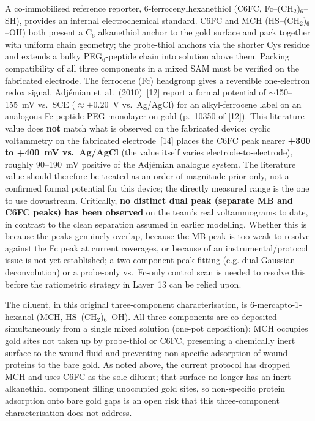 \documentclass[10pt,a4paper]{article}
\numberwithin{equation}{section}
\newcommand{\cit}[1]{[#1]}   %
\begin{document}
A co-immobilised reference reporter, 6-ferrocenylhexanethiol (C6FC,
Fc--(CH$_2$)$_6$--SH), provides an internal electrochemical standard. C6FC and MCH
(HS--(CH$_2$)$_6$--OH) both present a C$_6$ alkanethiol anchor to the gold surface
and pack together with uniform chain geometry; the probe-thiol anchors via the shorter
Cys residue and extends a bulky PEG$_6$-peptide chain into solution above them.
Packing compatibility of all three components in a mixed SAM must be verified
on the fabricated electrode. The ferrocene (Fc) headgroup gives a reversible one-electron redox signal.
Adj\'{e}mian et~al.\ (2010)~\cit{12} report a formal potential of
$\sim$150--155~mV vs.\ SCE ($\approx +0.20$~V vs.\ Ag/AgCl) for an alkyl-ferrocene
label on an analogous Fc-peptide-PEG monolayer on gold (p.~10350 of \cit{12}).
This literature value does \textbf{not} match what is observed on the fabricated
device: cyclic voltammetry on the fabricated electrode~\cit{14} places the C6FC
peak nearer \textbf{+300 to +400~mV vs.\ Ag/AgCl} (the value itself varies
electrode-to-electrode), roughly 90--190~mV positive of
the Adj\'{e}mian analogue system. The literature value should therefore be treated
as an order-of-magnitude prior only, not a confirmed formal potential for this
device; the directly measured range is the one to use downstream.
Critically, \textbf{no distinct dual peak (separate MB and C6FC peaks) has been
observed} on the team's real voltammograms to date, in contrast to the clean
separation assumed in earlier modelling. Whether this is because the peaks
genuinely overlap, because the MB peak is too weak to resolve against the Fc
peak at current coverages, or because of an instrumental/protocol issue is not
yet established; a two-component peak-fitting (e.g. dual-Gaussian deconvolution)
or a probe-only vs.\ Fc-only control scan is needed to resolve this before the
ratiometric strategy in Layer~13 can be relied upon.

The diluent, in this original three-component characterisation, is 6-mercapto-1-hexanol
(MCH, HS--(CH$_2$)$_6$--OH). All three components are co-deposited simultaneously from a
single mixed solution (one-pot deposition); MCH occupies gold sites not taken up by
probe-thiol or C6FC, presenting a chemically inert surface to the wound fluid and
preventing non-specific adsorption of wound proteins to the bare gold. As noted above,
the current protocol has dropped MCH and uses C6FC as the sole diluent; that surface no
longer has an inert alkanethiol component filling unoccupied gold sites, so non-specific
protein adsorption onto bare gold gaps is an open risk that this three-component
characterisation does not address.
\end{document}
